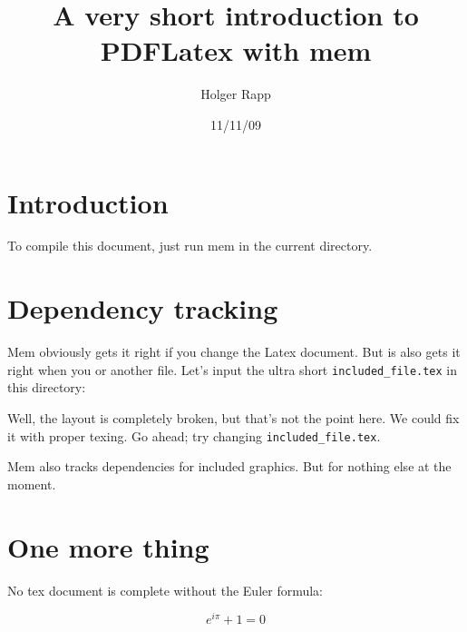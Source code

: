 \documentclass[]{article}
\title{A very short introduction to PDFLatex with mem}
\author{Holger Rapp}
\date{11/11/09}
\begin{document}
\maketitle

\section{Introduction}

To compile this document, just run mem in the current directory. 

\section{Dependency tracking}
\label{sub:dependency_tracking}

Mem obviously gets it right if you change the Latex document. But is also gets
it right when you \verb|| or \verb|| another file. Let's
input the ultra short \verb|included_file.tex| in this directory: 

\texttt{}

Well, the layout is completely broken, but that's not the point here. We could
fix it with proper texing.  Go ahead; try changing \verb|included_file.tex|.

Mem also tracks dependencies for included graphics. But for nothing else at the
moment.

\section{One more thing} 
\label{sec:one_more_thing}

No tex document is complete without the Euler formula:

\begin{equation}
   e^{i \pi} + 1 = 0
\end{equation}


\end{document}
